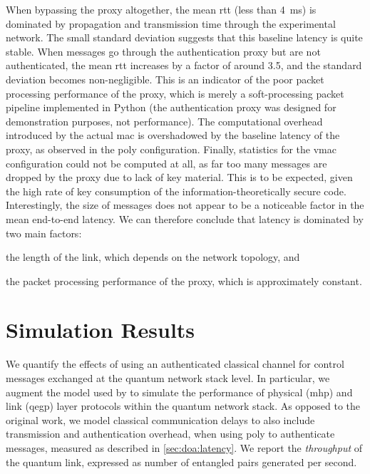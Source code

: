 When bypassing the proxy altogether, the mean \acrshort{rtt} (less than \qty{4}{\ms}) is dominated
by propagation and transmission time through the experimental network. The small standard deviation
suggests that this baseline latency is quite stable. When messages go through the authentication
proxy but are not authenticated, the mean \acrshort{rtt} increases by a factor of around \num{3.5},
and the standard deviation becomes non-negligible. This is an indicator of the poor packet
processing performance of the proxy, which is merely a soft-processing packet pipeline implemented
in Python (the authentication proxy was designed for demonstration purposes, not performance). The
computational overhead introduced by the actual \acrshort{mac} is overshadowed by the baseline
latency of the proxy, as observed in the \acrshort{poly} configuration. Finally, statistics for the
\acrshort{vmac} configuration could not be computed at all, as far too many messages are dropped by
the proxy due to lack of key material. This is to be expected, given the high rate of key
consumption of the information-theoretically secure code. Interestingly, the size of messages does
not appear to be a noticeable factor in the mean end-to-end latency. We can therefore conclude that
latency is dominated by two main factors:
%
\begin{inlinelist}
    \item the length of the link, which depends on the network topology, and
    \item the packet processing performance of the proxy, which is approximately constant.
\end{inlinelist}

\section{Simulation Results}
\label{sec:doa:results}

We quantify the effects of using an authenticated classical channel for control messages exchanged
at the quantum network stack level. In particular, we augment the model used by
\textcite{dahlberg_2019_egp} to simulate the performance of physical (\acrshort{mhp}) and link
(\acrshort{qegp}) layer protocols within the quantum network stack. As opposed to the original work,
we model classical communication delays to also include transmission and authentication overhead,
when using \acrshort{poly} to authenticate messages, measured as described in
\cref{sec:doa:latency}. We report the \emph{throughput} of the quantum link, expressed as number of
entangled pairs generated per second.

